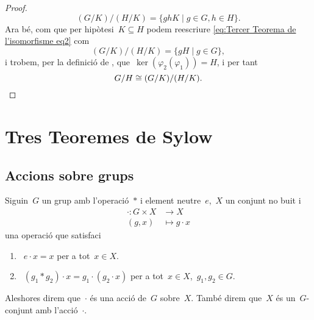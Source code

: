 \documentclass[../../Main.tex]{subfiles}
\begin{document}
\begin{theorem}
\begin{proof}
			\begin{equation}\label{eq:Tercer Teorema de l'isomorfisme eq2}
			(G/K)/(H/K)=\{ghK\mid g\in G,h\in H\}.
			\end{equation}
			Ara bé, com que per hipòtesi~\(K\subseteq H\) podem reescriure \eqref{eq:Tercer Teorema de l'isomorfisme eq2} com
			\[
			    (G/K)/(H/K)=\{gH\mid g\in G\},
			\]
			i trobem, per la definició de , que~\(\ker(\varphi_{2}(\varphi_{1}))=H\), i per tant
			\[
			    G/H\cong (G/K)/(H/K).\qedhere
			\]
		\end{proof}
	\end{theorem}
\section{Tres Teoremes de Sylow}
	\subsection{Accions sobre grups}
	\begin{definition}
		\label{def:acció d'un grup sobre un conjunt}
		Siguin~\(G\) un grup amb l'operació~\(\ast\) i element neutre~\(e\),~\(X\) un conjunt no buit i
		\begin{align*}
		\cdot\colon G\times X&\longrightarrow X\\
		(g,x)&\longmapsto g\cdot x
		\end{align*}
		una operació que satisfaci
		\begin{enumerate}
			\item~\(e\cdot x=x\) per a tot~\(x\in X\).
			\item~\((g_{1}\ast g_{2})\cdot x=g_{1}\cdot(g_{2}\cdot x)\) per a tot~\(x\in X\),~\(g_{1},g_{2}\in G\).
		\end{enumerate}
		Aleshores direm que~\(\cdot\) és una acció de~\(G\) sobre~\(X\).
		També direm que~\(X\) és un~\(G\)-conjunt amb l'acció~\(\cdot\).
	\end{definition}
\end{document}
